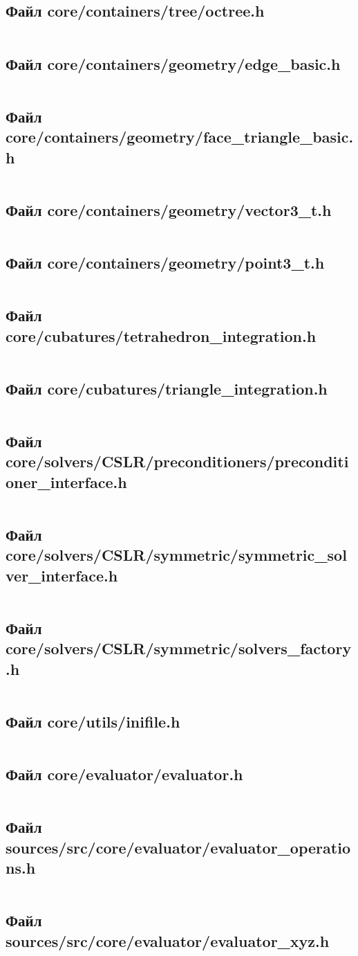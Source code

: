 \documentclass[a4paper,14pt]{article}
\newcommand{\subsectioncode}[3]{%
	\subsection*{#3}%
	\begin{singlespace}%
	\begin{scriptsize}%
	\inputminted{#1}{#2}%
	\end{scriptsize}%
	\end{singlespace}%
}
\newcommand{\subsectioncodeauto}[3]{%
	\subsectioncode{#1}{#2/#3}{Файл #3}%
}
\begin{document}
\subsectioncodeauto{cpp}{sources/src}{core/containers/tree/octree.h}

\subsectioncode{cpp}{sources/src/core/containers/geometry/edge_basic.h}{Файл core/containers/geometry/edge\_basic.h}
\subsectioncode{cpp}{sources/src/core/containers/geometry/face_triangle_basic.h}{Файл core/containers/geometry/face\_triangle\_basic.h}
\subsectioncode{cpp}{sources/src/core/containers/geometry/vector3_t.h}{Файл core/containers/geometry/vector3\_t.h}
\pagebreak
\subsectioncode{cpp}{sources/src/core/containers/geometry/point3_t.h}{Файл core/containers/geometry/point3\_t.h}

\subsectioncode{cpp}{sources/src/core/cubatures/tetrahedron_integration.h}{Файл core/cubatures/tetrahedron\_integration.h}
\subsectioncode{cpp}{sources/src/core/cubatures/triangle_integration.h}{Файл core/cubatures/triangle\_integration.h}

\subsectioncode{cpp}{sources/src/core/solvers/CSLR/preconditioners/preconditioner_interface.h}{Файл core/solvers/CSLR/preconditioners/preconditioner\_interface.h}
\subsectioncode{cpp}{sources/src/core/solvers/CSLR/symmetric/symmetric_solver_interface.h}{Файл core/solvers/CSLR/symmetric/symmetric\_solver\_interface.h}
\subsectioncode{cpp}{sources/src/core/solvers/CSLR/solvers_factory.h}{Файл core/solvers/CSLR/symmetric/solvers\_factory.h}

\subsectioncodeauto{cpp}{sources/src}{core/utils/inifile.h}

\subsectioncodeauto{cpp}{sources/src}{core/evaluator/evaluator.h}
\subsectioncode{cpp}{sources/src/core/evaluator/evaluator_operations.h}{Файл sources/src/core/evaluator/evaluator\_operations.h}
\subsectioncode{cpp}{sources/src/core/evaluator/evaluator_xyz.h}{Файл sources/src/core/evaluator/evaluator\_xyz.h}

\end{document}
